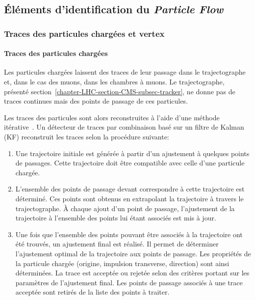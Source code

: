 \subsection{Éléments d'identification du \emph{Particle Flow}}\label{chapter-LHC-section-evt_reco-subsec-PF_elements}
\subsubsection{Traces des particules chargées et vertex}\label{chapter-LHC-section-evt_reco-subsec-PF_elements-subsubsec-tracks}
\paragraph{Traces des particules chargées}
Les particules chargées laissent des traces de leur passage dans le trajectographe et, dans le cas des muons, dans les chambres à muons.
Le trajectographe, présenté section~\ref{chapter-LHC-section-CMS-subsec-tracker}, ne donne pas de traces continues mais des points de passage de ces particules.
\par
Les traces des particules sont alors reconstruites
à l'aide d'une méthode itérative~\cite{particle-flow,track_reco}.
Un détecteur de traces par combinaison basé sur un filtre de Kalman (KF) \cite{Kalman_filter} reconstruit les traces selon la procédure suivante:
\begin{enumerate}
\item Une trajectoire initiale est générée à partir d'un ajustement à quelques points de passages.
Cette trajectoire doit être compatible avec celle d'une particule chargée.
\item L'ensemble des points de passage devant correspondre à cette trajectoire est déterminé.
Ces points sont obtenus en extrapolant la trajectoire à travers le trajectographe.
À chaque ajout d'un point de passage, l'ajustement de la trajectoire à l'ensemble des points lui étant associés est mis à jour.
\item Une fois que l'ensemble des points pouvant être associés à la trajectoire ont été trouvés, un ajustement final est réalisé.
Il permet de déterminer l'ajustement optimal de la trajectoire aux points de passage.
Les propriétés de la particule chargée (origine, impulsion transverse, direction) sont ainsi déterminées.
La trace est acceptée ou rejetée selon des critères portant sur les paramètres de l'ajustement final.
Les points de passage associés à une trace acceptée sont retirés de la liste des points à traiter.
\end{enumerate}
